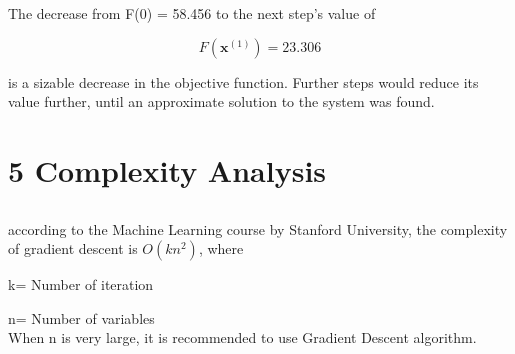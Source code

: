 \documentclass[11pt]{article}
\begin{document}
The decrease from F(0) = 58.456 to the next step's value of

    \[ F\left(\mathbf {x} ^{(1)}\right)=23.306\]

is a sizable decrease in the objective function. Further steps would reduce its value further, until an approximate solution to the system was found. 
\section*{5 Complexity Analysis}
\subsection*{}
according to the Machine Learning course by Stanford University, the complexity of gradient descent is \(O(kn^2)\), where

k= Number of iteration

n= Number of variables\\
When n is very large, it is recommended to use Gradient Descent algorithm.
\end{document}
